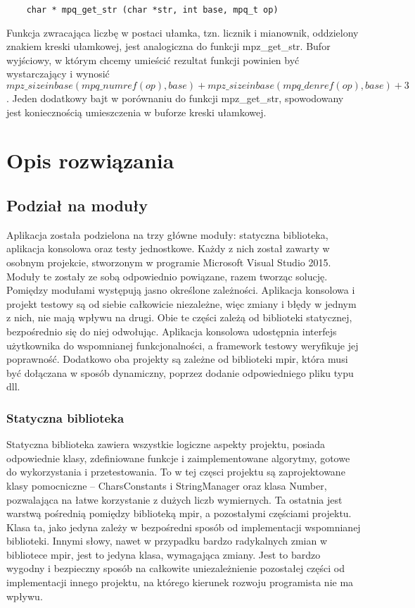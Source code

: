 \documentclass[oneside,a4paper]{book}
\begin{document}
	\begin{lstlisting}
	char * mpq_get_str (char *str, int base, mpq_t op)
	\end{lstlisting}
	
	Funkcja zwracająca liczbę w postaci ułamka, tzn. licznik i mianownik, oddzielony znakiem kreski ułamkowej, jest analogiczna do funkcji mpz\_get\_str. Bufor wyjściowy, w którym chcemy umieścić rezultat funkcji powinien być wystarczający i wynosić $mpz\_sizeinbase(mpq\_numref(op), \allowbreak base) + mpz\_sizeinbase (mpq\_denref(op), base) + 3$. Jeden dodatkowy bajt w porównaniu do funkcji mpz\_get\_str, spowodowany jest koniecznością umieszczenia w buforze kreski ułamkowej.
	
	
	\chapter{Opis rozwiązania}
	\section{Podział na moduły}
	
	Aplikacja została podzielona na trzy główne moduły: statyczna biblioteka, aplikacja konsolowa oraz testy jednostkowe. Każdy z nich został zawarty w osobnym projekcie, stworzonym w programie Microsoft Visual Studio 2015. Moduły te zostały ze sobą odpowiednio powiązane, razem tworząc solucję. Pomiędzy modułami występują jasno określone zależności. Aplikacja konsolowa i projekt testowy są od siebie całkowicie niezależne, więc zmiany i błędy w jednym z nich, nie mają wpływu na drugi. Obie te części zależą od biblioteki statycznej, bezpośrednio się do niej odwołując. Aplikacja konsolowa udostępnia interfejs użytkownika do wspomnianej funkcjonalności, a framework testowy weryfikuje jej poprawność. Dodatkowo oba projekty są zależne od biblioteki mpir, która musi być dołączana w sposób dynamiczny, poprzez dodanie odpowiedniego pliku typu dll. 
	
	\subsection{Statyczna biblioteka}
	
	Statyczna biblioteka zawiera wszystkie logiczne aspekty projektu, posiada odpowiednie klasy, zdefiniowane funkcje i zaimplementowane algorytmy, gotowe do wykorzystania i przetestowania. To w tej częsci projektu są zaprojektowane klasy pomocniczne -- CharsConstants i StringManager oraz klasa Number, pozwalająca na łatwe korzystanie z dużych liczb wymiernych. Ta ostatnia jest warstwą pośrednią pomiędzy biblioteką mpir, a pozostałymi częściami projektu. Klasa ta, jako jedyna zależy w bezpośredni sposób od implementacji wspomnianej biblioteki. Innymi słowy, nawet w przypadku bardzo radykalnych zmian w bibliotece mpir, jest to jedyna klasa, wymagająca zmiany. Jest to bardzo wygodny i bezpieczny sposób na całkowite uniezależnienie pozostałej części od implementacji innego projektu, na którego kierunek rozwoju programista nie ma wpływu.
	
\end{document}
